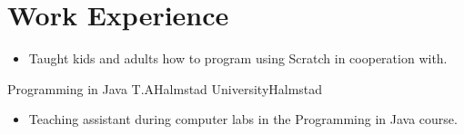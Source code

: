 \documentclass[11pt,a4paper,sans,colorlinks,linkcolor=blue,urlcolor=blue]{moderncv}
\begin{document}
\makecvtitle
\setlength{\parskip}{0.15em}
\vspace{-40.0pt}

\section{Work Experience}

{\begin{itemize}
    \itemsep0.3em
    \setlength{\itemindent}{.25in}
    \item Taught kids and adults how to program using Scratch in cooperation with.
\end{itemize} }

{Programming in Java T.A}{Halmstad University}{Halmstad}{}
{\begin{itemize}
    \itemsep0.3em
    \setlength{\itemindent}{.25in}
    \item Teaching assistant during computer labs in the Programming in Java course.
\end{itemize}}
\end{document}
